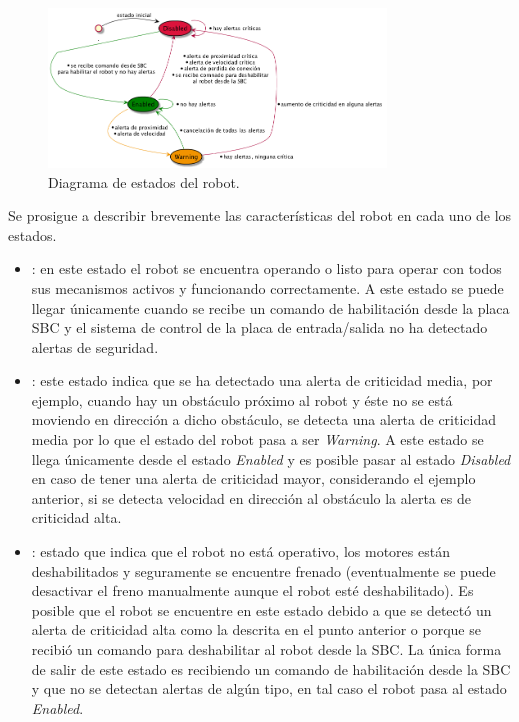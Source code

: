 \documentclass[withindex,glossary]{cam-thesis}
\begin{document}
\begin{figure}[H]
\centering
\includegraphics[width=0.8\textwidth]{images/Diagrama_de_estados_del_robot}
\caption[Diagrama de estados del robot]{Diagrama de estados del robot.}
\end{figure}

Se prosigue a describir brevemente las características del robot en cada uno de los estados.
\begin{itemize}
\item {}: en este estado el robot se encuentra operando o listo para operar con todos sus mecanismos activos y funcionando correctamente. A este estado se puede llegar únicamente cuando se recibe un comando de habilitación desde la placa \gls{SBC} y el sistema de control de la placa de entrada/salida no ha detectado alertas de seguridad.
\item {}: este estado indica que se ha detectado una alerta de criticidad media, por ejemplo, cuando hay un obstáculo próximo al robot y éste no se está moviendo en dirección a dicho obstáculo, se detecta una alerta de criticidad media por lo que el estado del robot pasa a ser \textit{Warning}. A este estado se llega únicamente desde el estado \textit{Enabled} y es posible pasar al estado \textit{Disabled} en caso de tener una alerta de criticidad mayor, considerando el ejemplo anterior, si se detecta velocidad en dirección al obstáculo la alerta es de criticidad alta.
\item {}: estado que indica que el robot no está operativo, los motores están deshabilitados y seguramente se encuentre frenado (eventualmente se puede desactivar el freno manualmente aunque el robot esté deshabilitado). Es posible que el robot se encuentre en este estado debido a que se detectó un alerta de criticidad alta como la descrita en el punto anterior o porque se recibió un comando para deshabilitar al robot desde la \gls{SBC}. La única forma de salir de este estado es recibiendo un comando de habilitación desde la \gls{SBC} y que no se detectan alertas de algún tipo, en tal caso el robot pasa al estado \textit{Enabled}.
\end{itemize}
\end{document}
